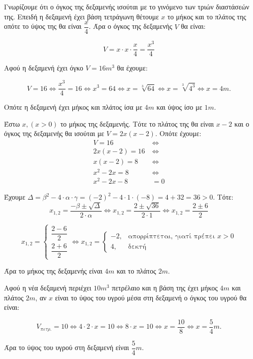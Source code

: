 
\begin{alist}
\item Γνωρίζουμε ότι ο όγκος της δεξαμενής ισούται με το γινόμενο των τριών διαστάσεών της. Επειδή η δεξαμενή έχει βάση τετράγωνη θέτουμε $x$ το μήκος και το πλάτος της οπότε το ύψος της θα είναι $\dfrac{x}{4}$. Άρα ο όγκος της δεξαμενής $V$ θα είναι:

\[V = x \cdot x \cdot \dfrac{x}{4} = \dfrac{x^3}{4}\]

Αφού η δεξαμενή έχει όγκο $V = 16 m^3$ θα έχουμε:

\[V = 16 \Leftrightarrow \dfrac{x^3}{4} = 16 \Leftrightarrow x^3 = 64 \Leftrightarrow x = \sqrt[3]{64} \Leftrightarrow x = \sqrt[3]{4^3} \Leftrightarrow x = 4m.\]

Οπότε η δεξαμενή έχει μήκος και πλάτος ίσα με $4m$ και ύψος ίσο με $1m$.

\item Έστω $x, (x > 0)$ το μήκος της δεξαμενής. Τότε το πλάτος της θα είναι $x-2$ και ο όγκος της δεξαμενής θα ισούται με $V = 2x(x - 2)$.
Οπότε έχουμε:
\begin{align*}
V = 16 \ &\Leftrightarrow \\
2x(x - 2) = 16 \ &\Leftrightarrow \\
x(x - 2) = 8 \ &\Leftrightarrow \\
x^2 - 2x = 8 \ &\Leftrightarrow \\
x^2 - 2x - 8 &= 0
\end{align*}

Έχουμε $\Delta = \beta^2 - 4 \cdot \alpha \cdot \gamma = (-2)^2 - 4 \cdot 1 \cdot (-8) = 4 + 32 = 36 > 0$.
Τότε:
\[x_{1,2} = \dfrac{-\beta \pm \sqrt{\Delta}}{2 \cdot \alpha} \Leftrightarrow x_{1,2} = \dfrac{2 \pm \sqrt{36}}{2 \cdot 1} \Leftrightarrow x_{1,2} = \dfrac{2 \pm 6}{2}\]

\[x_{1,2} = \begin{cases} \dfrac{2 - 6}{2} \\ \dfrac{2 + 6}{2} \end{cases} \Leftrightarrow x_{1,2} = \begin{cases} -2, & \text{απορρίπτεται, γιατί πρέπει } x > 0 \\ 4, & \text{δεκτή} \end{cases}\]

Άρα το μήκος της δεξαμενής είναι $4m$ και το πλάτος $2m$.

\item Αφού η νέα δεξαμενή περιέχει $10m^3$ πετρέλαιο και η βάση της έχει μήκος $4m$ και πλάτος $2m$, αν $x$ είναι το ύψος του υγρού μέσα στη δεξαμενή ο όγκος του υγρού θα είναι:

\[V_{\pi\varepsilon\tau\rho.} = 10 \Leftrightarrow 4 \cdot 2 \cdot x = 10 \Leftrightarrow 8 \cdot x = 10 \Leftrightarrow x = \dfrac{10}{8} \Leftrightarrow x = \dfrac{5}{4}m.\]

Άρα το ύψος του υγρού στη δεξαμενή είναι $\dfrac{5}{4}m$.
\end{alist}

